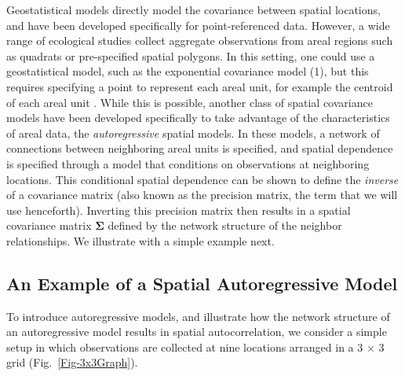 \documentclass[11pt, titlepage]{article}\usepackage[]{graphicx}\usepackage[]{color}
\begin{document}
\begin{spacing}{1.9}
\begin{flushleft}
Geostatistical models directly model the covariance between spatial locations, and have been developed specifically for point-referenced data.  However, a wide range of ecological studies collect aggregate observations from areal regions such as quadrats or pre-specified spatial polygons.  In this setting, one could use a geostatistical model, such as the exponential covariance model (1), but this requires specifying a point to represent each areal unit, for example the centroid of each areal unit \citep[e.g.,][]{Ver:Cres:spat:1993}.  While this is possible, another class of spatial covariance models have been developed specifically to take advantage of the characteristics of areal data, the \emph{autoregressive} spatial models.  In these models, a network of connections between neighboring areal units is specified, and spatial dependence is specified through a model that conditions on observations at neighboring locations.  This conditional spatial dependence can be shown to define the \emph{inverse} of a covariance matrix (also known as the precision matrix, the term that we will use henceforth).  Inverting this precision matrix then results in a spatial covariance matrix $\boldsymbol\Sigma$ defined by the network structure of the neighbor relationships. We illustrate with a simple example next.   

\subsection*{An Example of a Spatial Autoregressive Model}


To introduce autoregressive models, and illustrate how the network structure of an autoregressive model results in spatial autocorrelation, we consider a simple setup in which observations are collected at nine locations arranged in a 3 $\times$ 3 grid (Fig.~\ref{Fig-3x3Graph}).



\end{flushleft}
\end{spacing}
\end{document}
